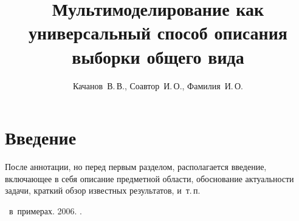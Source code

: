\documentclass[12pt,twoside]{article}
\title
    [Мультимоделирование как универсальный способ описания выборки общего вида] 
    {Мультимоделирование как универсальный способ описания выборки общего вида}
\author
    [Качанов~В.\,В.] %
    {Качанов~В.\,В., Соавтор~И.\,О., Фамилия~И.\,О.} %
\begin{document}
\maketitle
\section{Введение}
После аннотации, но перед первым разделом,
располагается введение, включающее в себя
описание предметной области,
обоснование актуальности задачи,
краткий обзор известных результатов,
и~т.\,п.


\begin{thebibliography}{1}
    \LaTeXe\ в~примерах.
    2006.
    .
\end{thebibliography}
\end{document}
